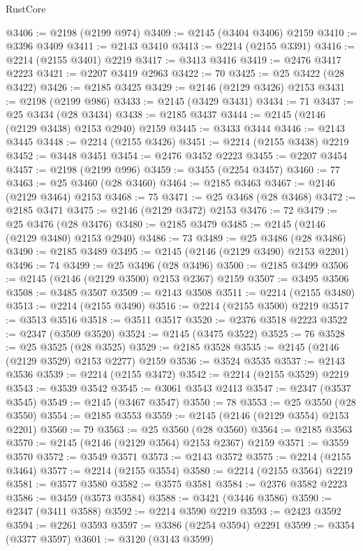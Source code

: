 \begin{lexlean}{RustCore}
\begin{coremodule}
@3406 := @2198 (@2199 @974)
@3409 := @2145 (@3404 @3406) @2159
@3410 := @3396 @3409
@3411 := @2143 @3410
@3413 := @2214 (@2155 @3391)
@3416 := @2214 (@2155 @3401) @2219
@3417 := @3413 @3416
@3419 := @2476 @3417 @2223
@3421 := @2207 @3419 @2963
@3422 := 70
@3425 := @25 @3422 (@28 @3422)
@3426 := @2185 @3425
@3429 := @2146 (@2129 @3426) @2153
@3431 := @2198 (@2199 @986)
@3433 := @2145 (@3429 @3431)
@3434 := 71
@3437 := @25 @3434 (@28 @3434)
@3438 := @2185 @3437
@3444 := @2145 (@2146 (@2129 @3438) @2153 @2940) @2159
@3445 := @3433 @3444
@3446 := @2143 @3445
@3448 := @2214 (@2155 @3426)
@3451 := @2214 (@2155 @3438) @2219
@3452 := @3448 @3451
@3454 := @2476 @3452 @2223
@3455 := @2207 @3454
@3457 := @2198 (@2199 @996)
@3459 := @3455 (@2254 @3457)
@3460 := 77
@3463 := @25 @3460 (@28 @3460)
@3464 := @2185 @3463
@3467 := @2146 (@2129 @3464) @2153
@3468 := 75
@3471 := @25 @3468 (@28 @3468)
@3472 := @2185 @3471
@3475 := @2146 (@2129 @3472) @2153
@3476 := 72
@3479 := @25 @3476 (@28 @3476)
@3480 := @2185 @3479
@3485 := @2145 (@2146 (@2129 @3480) @2153 @2940)
@3486 := 73
@3489 := @25 @3486 (@28 @3486)
@3490 := @2185 @3489
@3495 := @2145 (@2146 (@2129 @3490) @2153 @2201)
@3496 := 74
@3499 := @25 @3496 (@28 @3496)
@3500 := @2185 @3499
@3506 := @2145 (@2146 (@2129 @3500) @2153 @2367) @2159
@3507 := @3495 @3506
@3508 := @3485 @3507
@3509 := @2143 @3508
@3511 := @2214 (@2155 @3480)
@3513 := @2214 (@2155 @3490)
@3516 := @2214 (@2155 @3500) @2219
@3517 := @3513 @3516
@3518 := @3511 @3517
@3520 := @2376 @3518 @2223
@3522 := @2347 (@3509 @3520)
@3524 := @2145 (@3475 @3522)
@3525 := 76
@3528 := @25 @3525 (@28 @3525)
@3529 := @2185 @3528
@3535 := @2145 (@2146 (@2129 @3529) @2153 @2277) @2159
@3536 := @3524 @3535
@3537 := @2143 @3536
@3539 := @2214 (@2155 @3472)
@3542 := @2214 (@2155 @3529) @2219
@3543 := @3539 @3542
@3545 := @3061 @3543 @2413
@3547 := @2347 (@3537 @3545)
@3549 := @2145 (@3467 @3547)
@3550 := 78
@3553 := @25 @3550 (@28 @3550)
@3554 := @2185 @3553
@3559 := @2145 (@2146 (@2129 @3554) @2153 @2201)
@3560 := 79
@3563 := @25 @3560 (@28 @3560)
@3564 := @2185 @3563
@3570 := @2145 (@2146 (@2129 @3564) @2153 @2367) @2159
@3571 := @3559 @3570
@3572 := @3549 @3571
@3573 := @2143 @3572
@3575 := @2214 (@2155 @3464)
@3577 := @2214 (@2155 @3554)
@3580 := @2214 (@2155 @3564) @2219
@3581 := @3577 @3580
@3582 := @3575 @3581
@3584 := @2376 @3582 @2223
@3586 := @3459 (@3573 @3584)
@3588 := @3421 (@3446 @3586)
@3590 := @2347 (@3411 @3588)
@3592 := @2214 @3590 @2219
@3593 := @2423 @3592
@3594 := @2261 @3593
@3597 := @3386 (@2254 @3594) @2291
@3599 := @3354 (@3377 @3597)
@3601 := @3120 (@3143 @3599)

\end{coremodule}
\end{lexlean}
